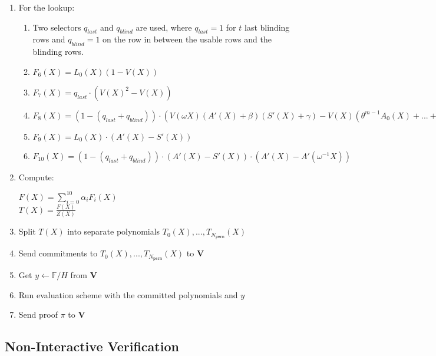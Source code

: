 \begin{enumerate}
	\item For the lookup:
	\begin{enumerate}
		\item Two selectors $q_{last}$ and $q_{blind}$ are used, where $q_{last} = 1$ for $t$ last blinding rows and $q_{blind} = 1$ on the row in between the usable rows and the blinding rows.
		\item $F_6(X) = L_0(X) (1 - V(X))$
		\item $F_7(X) = q_{last} \cdot (V(X)^2 - V(X))$
		\item $F_8(X) = (1 - (q_{last} + q_{blind})) \cdot ( V(\omega X) (A'(X) + \beta) (S'(X) + \gamma) - V(X) (\theta^{m-1} A_0(X) + ... + A_{m-1}(X) + \beta) (\theta^{m-1} S_0(X) + ... + S_{m-1}(X) + \gamma) )$
		\item $F_9(X) = L_0(X) \cdot (A'(X) - S'(X))$
		\item $F_{10}(X) = (1 - (q_{last} + q_{blind})) \cdot (A'(X) - S'(X))\cdot(A'(X) - A'(\omega^{-1} X))$
	\end{enumerate}
	\item Compute:
	\begin{center}
		$F(X) = \sum\limits_{i = 0}^{10} \alpha_iF_i(X)$ \\
		$T(X) = \frac{F(X)}{Z(X)}$
	\end{center}
	\item Split $T(X)$ into separate polynomials $T_0(X), ..., T_{N_{\texttt{perm}}}(X)$
	\item Send commitments to $T_0(X), ..., T_{N_{\texttt{perm}}}(X)$ to \textbf{V}
	\item Get $y \leftarrow \mathbb{F}/H$ from \textbf{V}
	\item Run evaluation scheme with the committed polynomials and $y$
	\item Send proof $\pi$ to $\textbf{V}$
\end{enumerate}

\subsection{Non-Interactive Verification}

